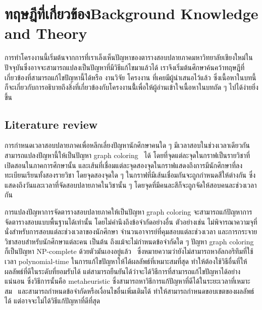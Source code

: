 \chapter{\ifcpe ทฤษฎีที่เกี่ยวข้อง\else Background Knowledge and Theory\fi}

การทำโครงงานนี้เริ่มต้นจากการที่เราเล็งเห็นปัญหาของตารางสอบปลายภาคมหาวิทยาลัยเชียงใหม่ในปัจจุบันซึ่งอาจจะสามารถแปลงเป็นปัญหาที่มีวิธีแก้ไขมาแล้วได้ เราจึงเริ่มต้นศึกษาค้นคว้าทฤษฎีที่เกี่ยวข้องที่สามารถแก้ไขปัญหานี้ได้หรือ งานวิจัย โครงงาน ที่เคยมีผู้นำเสนอไว้แล้ว
ซึ่งเนื้อหาในบทนี้ก็จะเกี่ยวกับการอธิบายถึงสิ่งที่เกี่ยวข้องกับโครงงานนี้้เพื่อให้ผู้อ่านเข้าใจเนื้อหาในบทถัด ๆ ไปได้ง่ายยิ่งขึ้น
\section{Literature review}
การกำหนดเวลาสอบปลายภาคเพื่อหลีกเลี่ยงปัญหานักศึกษาคนใด ๆ มีเวลาสอบในช่วงเวลาเดียวกันสามารถแปลงปัญหานี้ให้เป็นปัญหา graph coloring~\cite{mcs} ได้ 
โดยที่จุดแต่ละจุดในกราฟเป็นรายวิชาที่เปิดสอนในภาคการศึกษานั้น 
และเส้นที่เชื่อมแต่ละจุดสองจุดในกราฟแสดงถึงการมีนักศึกษาที่ลงทะเบียนเรียนทั้งสองรายวิชา โดยจุดสองจุดใด ๆ ในกราฟที่มีเส้นเชื่อมกันจะถูกกำหนดสีให้ต่างกัน
ซึ่งแสดงถึงวันและเวลาที่จัดสอบปลายภาคในวิชานั้น ๆ โดยจุดที่มีคนละสีก็จะถูกจัดให้สอบคนละช่วงเวลากัน

การแปลงปัญหาการจัดตารางสอบปลายภาคให้เป็นปัญหา graph coloring จะสามารถแก้ปัญหาการจัดตารางสอบแบบพื้นฐานได้เท่านั้น โดยไม่คำนึงถึงข้อจำกัดอย่างอื่น 
ตัวอย่างเช่น ไม่พิจารณาความจุที่นั่งสำหรับการสอบแต่ละช่วงเวลาของนักศึกษา จำนวนอาจารย์ที่คุมสอบแต่ละช่วงเวลา และการกระจายวิชาสอบสำหรับนักศึกษาแต่ละคน เป็นต้น
ถึงแม้จะไม่กำหนดข้อจำกัดใด ๆ ปัญหา graph coloring ก็เป็นปัญหา NP-complete ด้วยตัวมันเองอยู่แล้ว~\cite{alg-design} 
ซึ่งหมายความว่ายังไม่สามารถหาอัลกอริทึมที่ใช้เวลา polynomial-time ในการแก้ไขปัญหาให้ได้ผลลัพธ์ที่เหมาะสมที่สุด 
ทำให้ต้องใช้วิธีอื่นที่ให้ผลลัพธ์ที่ดีในระดับที่ยอมรับได้ แต่สามารถยืนยันได้ว่าจะได้วิธีการที่สามารถแก้ไขปัญหาได้อย่างแน่นอน 
ซึ่งวิธีการนั้นคือ metaheuristic ซึ่งสามารถหาวิธีการแก้ปัญหาที่ดีได้ในระยะเวลาที่เหมาะสม~\cite{meta-for-vertexcolor}
และสามารถกำหนดข้อจำกัดหรือเงื่อนไขอื่นเพิ่มเติมได้ ทำให้สามารถกำหนดขอบเขตของผลลัพธ์ได้ แต่อาจจะไม่ได้วิธีแก้ปัญหาที่ดีที่สุด

